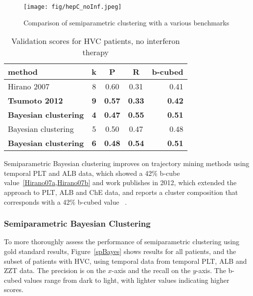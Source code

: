 \begin{figure}[ht!]
\vskip 0.2in
\begin{center}
\centerline{\texttt{[image: fig/hepC\_noInf.jpeg]}}
\caption{Comparison of semiparametric clustering with a various benchmarks}
\label{hepC_noinf_fig}
\end{center}
\vskip -0.2in
\end{figure}

\begin{table}[ht!]
\caption{Validation scores for HVC patients, no interferon therapy}
\label{hepC_noInftable}
\vskip 0.15in
\begin{center}
\begin{tabular}{lcccr}
\hline
\hline
method	& k	& P	& R	& b-cubed \\
\hline
\hline
Hirano 2007	& 8& 0.60& 0.31& 0.41 \\
\textbf{Tsumoto 2012}	& \textbf{9}& \textbf{0.57}& \textbf{0.33}& \textbf{0.42} \\
\textbf{Bayesian clustering}	& \textbf{4}& \textbf{0.47}& \textbf{0.55}& \textbf{0.51 }\\
Bayesian clustering	        & 5& 0.50& 0.47& 0.48 \\
\textbf{Bayesian clustering}	        &\textbf{ 6}& \textbf{0.48}& \textbf{0.54}& \textbf{0.51} \\
\hline
\hline
\end{tabular}
\end{center}
\end{table}

 Semiparametric Bayesian clustering improves on trajectory mining methods using temporal PLT and ALB data, which showed a 42\% b-cube value~\ref{Hirano07a,Hirano07b} and work publishes in 2012, which extended the approach to PLT, ALB and ChE data, and reports a cluster composition that corresponds with a 42\% b-cubed value ~\cite{Tsumoto12}.



\subsubsection{Semiparametric Bayesian Clustering}
To more thoroughly assess the performance of semiparametric clustering using gold standard results, Figure~\ref{spBayes} shows results for all patients, and the subset of patients with HVC, using temporal data from temporal PLT, ALB and ZZT data. The precision is on the $x$-axis and the recall on the $y$-axis.  The b-cubed values range from dark to light, with lighter values indicating higher scores.

